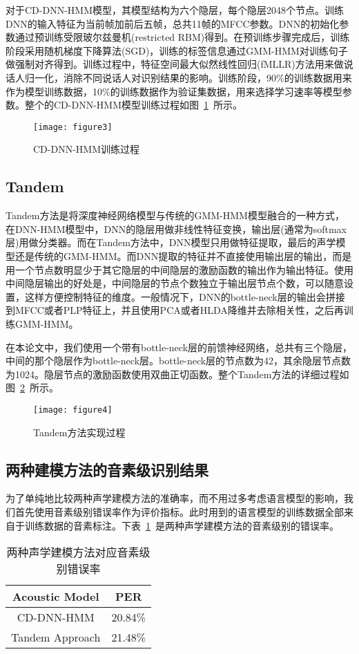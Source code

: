 对于CD-DNN-HMM模型，其模型结构为六个隐层，每个隐层2048个节点。训练DNN的输入特征为当前帧加前后五帧，总共11帧的MFCC参数。DNN的初始化参数通过预训练受限玻尔兹曼机(restricted RBM)得到。在预训练步骤完成后，训练阶段采用随机梯度下降算法(SGD)，训练的标签信息通过GMM-HMM对训练句子做强制对齐得到。训练过程中，特征空间最大似然线性回归(fMLLR)方法用来做说话人归一化，消除不同说话人对识别结果的影响。训练阶段，90\%的训练数据用来作为模型训练数据，10\%的训练数据作为验证集数据，用来选择学习速率等模型参数。整个的CD-DNN-HMM模型训练过程如图~\ref{fig:figure3}~所示。
\begin{figure}[htbp]
\centering
\texttt{[image: figure3]}
\caption{CD-DNN-HMM训练过程}\label{fig:figure3}
\vspace{\baselineskip}
\end{figure}

\subsection{Tandem}
Tandem方法是将深度神经网络模型与传统的GMM-HMM模型融合的一种方式，在DNN-HMM模型中，DNN的隐层用做非线性特征变换，输出层(通常为softmax层)用做分类器。而在Tandem方法中，DNN模型只用做特征提取，最后的声学模型还是传统的GMM-HMM。而DNN提取的特征并不直接使用输出层的输出，而是用一个节点数明显少于其它隐层的中间隐层的激励函数的输出作为输出特征。使用中间隐层输出的好处是，中间隐层的节点个数独立于输出层节点个数，可以随意设置，这样方便控制特征的维度。一般情况下，DNN的bottle-neck层的输出会拼接到MFCC或者PLP特征上，并且使用PCA或者HLDA降维并去除相关性，之后再训练GMM-HMM。

在本论文中，我们使用一个带有bottle-neck层的前馈神经网络，总共有三个隐层，中间的那个隐层作为bottle-neck层。bottle-neck层的节点数为42，其余隐层节点数为1024。隐层节点的激励函数使用双曲正切函数。整个Tandem方法的详细过程如图~\ref{fig:figure4}~所示。
\begin{figure}[htbp]
\centering
\texttt{[image: figure4]}
\caption{Tandem方法实现过程}\label{fig:figure4}
\vspace{\baselineskip}
\end{figure}

\subsection{两种建模方法的音素级识别结果}
为了单纯地比较两种声学建模方法的准确率，而不用过多考虑语言模型的影响，我们首先使用音素级别错误率作为评价指标。此时用到的语言模型的训练数据全部来自于训练数据的音素标注。下表~\ref{tab:table2}~是两种声学建模方法的音素级别的错误率。
\begin{table}[htbp]
\caption{两种声学建模方法对应音素级别错误率}\label{tab:table2}
\vspace{0.5em}\centering\wuhao
\begin{tabular}{cc}
\toprule[1.5pt]
Acoustic Model & PER \\
\midrule[1pt]
 CD-DNN-HMM & 20.84\% \\
Tandem Approach & 21.48\% \\
\bottomrule[1.5pt]
\end{tabular}
\vspace{\baselineskip}
\end{table}

